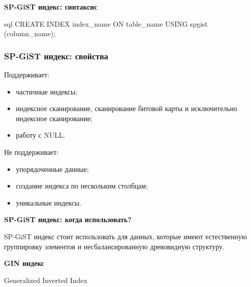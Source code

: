 \documentclass[aspectratio=169]{beamer}
\begin{document}
\begin{frame}[fragile]
  \begin{center}
    {\Large \textbf{SP-GiST индекс: синтаксис}}

    \vspace*{1em}

    \begin{cminted}{sql}
      CREATE INDEX index_name ON table_name USING spgist (column_name);
    \end{cminted}
  \end{center}
\end{frame}

\begin{frame}
  \frametitle{SP-GiST индекс: свойства}

  Поддерживает:
  \begin{itemize}
    \item частичные индексы;
    \item индексное сканирование, сканирование битовой карты и исключительно
    индексное сканирование;
    \item работу с NULL.
  \end{itemize}

  Не поддерживает:
  \begin{itemize}
    \item упорядоченные данные;
    \item создание индекса по нескольким столбцам;
    \item уникальные индексы.
  \end{itemize}
\end{frame}

\begin{frame}
  \vspace*{1em}
  \begin{center}
    {\LARGE \textbf{SP-GiST индекс: когда использовать?}}

    \vspace*{1em}

    SP-GiST индекс стоит использовать для данных, которые имеют естественную
    группировку элементов и несбалансированную древовидную структуру.
  \end{center}
\end{frame}

\begin{frame}
  \vspace*{1em}
  \begin{center}
    {\huge \textbf{GIN индекс}}

    \vspace*{1em}

    Generalized Inverted Index
  \end{center}
\end{frame}
\end{document}

